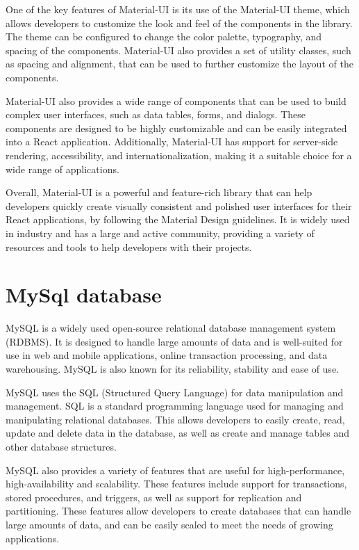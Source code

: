 One of the key features of Material-UI is its use of the Material-UI theme, which allows developers to customize the look and feel of the components in the library. The theme can be configured to change the color palette, typography, and spacing of the components. Material-UI also provides a set of utility classes, such as spacing and alignment, that can be used to further customize the layout of the components.

Material-UI also provides a wide range of components that can be used to build complex user interfaces, such as data tables, forms, and dialogs. These components are designed to be highly customizable and can be easily integrated into a React application. Additionally, Material-UI has support for server-side rendering, accessibility, and internationalization, making it a suitable choice for a wide range of applications.

Overall, Material-UI is a powerful and feature-rich library that can help developers quickly create visually consistent and polished user interfaces for their React applications, by following the Material Design guidelines. It is widely used in industry and has a large and active community, providing a variety of resources and tools to help developers with their projects.
\section{MySql database}
MySQL is a widely used open-source relational database management system (RDBMS). It is designed to handle large amounts of data and is well-suited for use in web and mobile applications, online transaction processing, and data warehousing. MySQL is also known for its reliability, stability and ease of use.

MySQL uses the SQL (Structured Query Language) for data manipulation and management. SQL is a standard programming language used for managing and manipulating relational databases. This allows developers to easily create, read, update and delete data in the database, as well as create and manage tables and other database structures.

MySQL also provides a variety of features that are useful for high-performance, high-availability and scalability. These features include support for transactions, stored procedures, and triggers, as well as support for replication and partitioning. These features allow developers to create databases that can handle large amounts of data, and can be easily scaled to meet the needs of growing applications.

